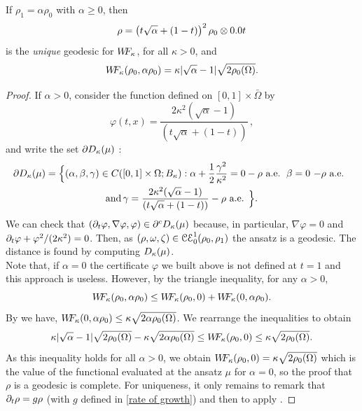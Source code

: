 \begin{proposition}
If $\rho_1=\alpha \rho_0$ with $\alpha \geq 0$, then 
\[ 
\rho=\left( t\sqrt{\alpha} + (1-t)\right)^2 \rho_0 \otimes \d t
\]
is the \emph{unique} geodesic for $W\! \! F_{\kappa}$, for all $\kappa>0$, and
\[
W\! \! F_{\kappa}(\rho_0,\alpha \rho_0)= \kappa \vert \sqrt{\alpha} - 1 \vert \sqrt{2\rho_0(\Omega)}.
\]
\end{proposition}

\begin{proof}
 If $\alpha>0$, consider the function defined on $[0,1]\times \bar{\Omega}$ by
\[
\varphi(t,x)=\frac{2\kappa^2(\sqrt{\alpha}-1)}{(t\sqrt{\alpha}+(1-t))} \, ,
\]
and write the set $\partial D_{\kappa} (\mu)$ :
\begin{multline}
\partial D_{\kappa} (\mu) = \Big\{ (\alpha,\beta,\gamma) \in C([0,1]\times \Omega; B_{\kappa}) :
 \alpha+\frac12 \frac{\gamma^2}{\kappa^2} = 0 - \text{$\rho$ a.e.\, $\beta = 0 $ $-\rho$ a.e.\,  }\\
\text{and}\, \gamma=\frac{2\kappa^2(\sqrt{\alpha}-1)}{(t\sqrt{\alpha}+(1-t))} - \text{$\rho$ a.e. }
 \Big\}.
\end{multline}
We can check that $(\partial_t \varphi, \nabla \varphi, \varphi) \in \partial^c D_{\kappa} (\mu)$ because, in particular, $\nabla \varphi = 0$ and $\partial_t \varphi+\varphi^2/(2\kappa^2)=0$. Then, as $(\rho,\omega,\zeta)\in \mathcal{CE}_0^1(\rho_0,\rho_1)$ the ansatz is a geodesic. The distance is found by computing $D_{\kappa}(\mu)$. \\

Note that, if $\alpha=0$ the certificate $\varphi$ we built above is not defined at $t=1$ and this approach is useless. However, by the triangle inequality, for any $\alpha>0$, 
\[
W\! \! F_{\kappa} (\rho_0,\alpha \rho_0) \leq W\! \! F_{\kappa} (\rho_0,0) + W\! \! F_{\kappa} (0,\alpha \rho_0).
\]
By  we have, $W\! \! F_{\kappa}(0,\alpha \rho_0)\leq \kappa \sqrt{2\alpha \rho_0(\Omega)}$. We rearrange the inequalities to obtain
\[
\kappa \vert \sqrt{\alpha} - 1 \vert \sqrt{2\rho_0(\Omega)} - \kappa \sqrt{2\alpha \rho_0(\Omega)} \leq W\! \! F_{\kappa} (\rho_0,0) \leq \kappa \sqrt{2\rho_0(\Omega)}.
\]
As this inequality holds for all $\alpha > 0$, we obtain $W\! \! F_{\kappa} (\rho_0,0)=\kappa\sqrt{2\rho_0(\Omega)}$ which is the value of the functional evaluated at the ansatz $\mu$ for $\alpha=0$, so the proof that $\rho$ is a geodesic is complete. For uniqueness, it only remains to remark that $\partial_t \rho = g \rho$ (with $g$ defined in \eqref{rate of growth}) and then to apply .
\end{proof}

